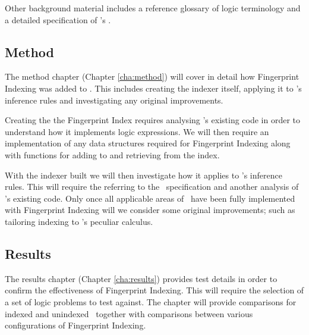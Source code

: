 Other background material includes a reference glossary of logic terminology and
a detailed specification of \beagle's \HSWAC.

\subsection{Method}

The method chapter (Chapter \ref{cha:method}) will cover in detail how Fingerprint
Indexing was added to \beagle. This includes creating the indexer itself, applying
it to \beagle's inference rules and investigating any original improvements.

Creating the the Fingerprint Index requires analysing \beagle's existing code
in order to understand how it implements logic expressions. We will then require
an implementation of any data structures required for Fingerprint Indexing along
with functions for adding to and retrieving from the index.

With the indexer built we will then investigate how it applies to \beagle's inference
rules. This will require the referring to the \HSWAC\ specification and another analysis of \beagle's existing code.
Only once all applicable areas of \beagle\ have been fully implemented with Fingerprint
Indexing will we consider some original improvements; such as tailoring indexing
to \beagle's peculiar calculus.

\subsection{Results}

The results chapter (Chapter \ref{cha:results}) provides test details
in order to confirm the effectiveness of Fingerprint Indexing. This will require
the selection of a set of logic problems to test against.
The chapter will provide comparisons for indexed and unindexed \beagle\ together
with comparisons between various configurations of Fingerprint Indexing.

